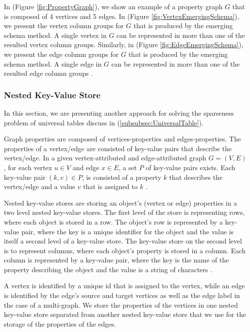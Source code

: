 {In (Figure \ref{fig:PropertyGraph}), we show an example of a property graph $G$ that is composed of 4 vertices and 5 edges. In (Figure \ref{fig:VertexEmergingSchema}), we present the vertex column groups for $G$ that is produced by the emerging schema method. A single vertex in $G$ can be represented in more than one of the resulted vertex column groups. Similarly, in (Figure \ref{fig:EdgeEmergingSchema}), we present the edge column groups for $G$ that is produced by the emerging schema method. A single edge in $G$ can be represented in more than one of the resulted edge column groups \cite{Paradies2017}.


\subsubsection{Nested Key-Value Store}
\label{subsubsec:NestedkeyValueStore}

In this section, we are presenting another approach for solving the sparseness problem of universal tables discuss in (\ref{subsubsec:UniversalTable}).

Graph properties are composed of vertices-properties and edges-properties. The properties of a vertex/edge are consisted of key-value pairs that describe the vertex/edge. In a given vertex-attributed and edge-attributed graph $G = (V,E)$, for each vertex $u \in V$ and edge $x \in E$, a set $P$ of key-value pairs exists. Each key-value pair $(k,v) \in P$, is consisted of a property $k$ that describes the vertex/edge and a value $v$ that is assigned to $k$ \cite{ladwig2011cumulusrdf}.

Nested key-value stores are storing an object's (vertex or edge) properties in a two level nested key-value stores. The first level of the store is representing rows, where each object is stored in a row. The object's row is represented by a key-value pair, where the key is a unique identifier for the object and the value is itself a second level of a key-value store. The key-value store on the second level is to represent columns, where each object's property is stored in a column. Each column is represented by a key-value pair, where the key is the name of the property describing the object and the value is a string of characters \cite{ladwig2011cumulusrdf}.

A vertex is identified by a unique id  that is assigned to the vertex, while an edge is identified by the edge's source and target vertices as well as the edge label in the case of a multi-graph. We store the properties of the vertices in one nested key-value store separated from another nested key-value store that we use for the storage of the properties of the edges.


}

